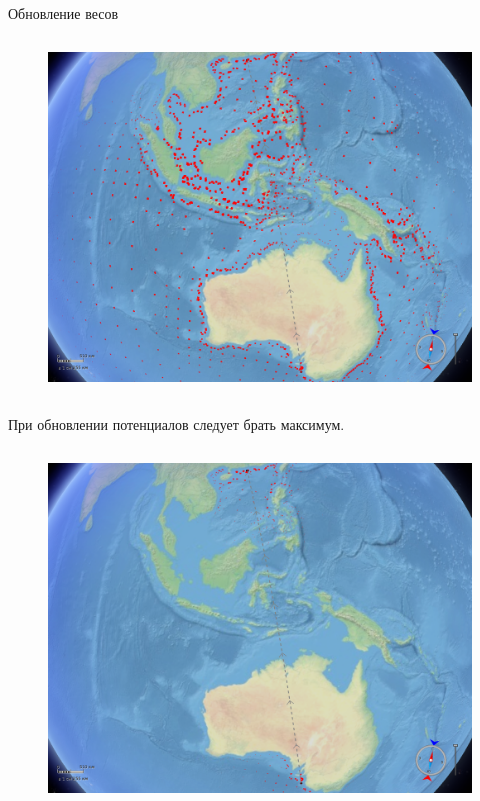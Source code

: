 \documentclass[russian, hyperref={unicode}]{beamer}
\theoremstyle{definition}
\begin{document}
\begin{frame}{Обновление весов}
{\begin{columns}
            \begin{figure}
                \includegraphics[clip=true, trim = 280pt 0 20pt 0, width=\textwidth]{potentials-update/max3}
            \end{figure}
        \end{columns}
        
        \begin{center}
            При обновлении потенциалов следует брать максимум.
        \end{center}
    }
   
     {
        \begin{columns}
            \begin{figure}
                \includegraphics[clip=true, trim = 280pt 0 20pt 0, width=\textwidth]{potentials-update/accum4}
            \end{figure}


\end{columns}}
\end{frame}
\end{document}
